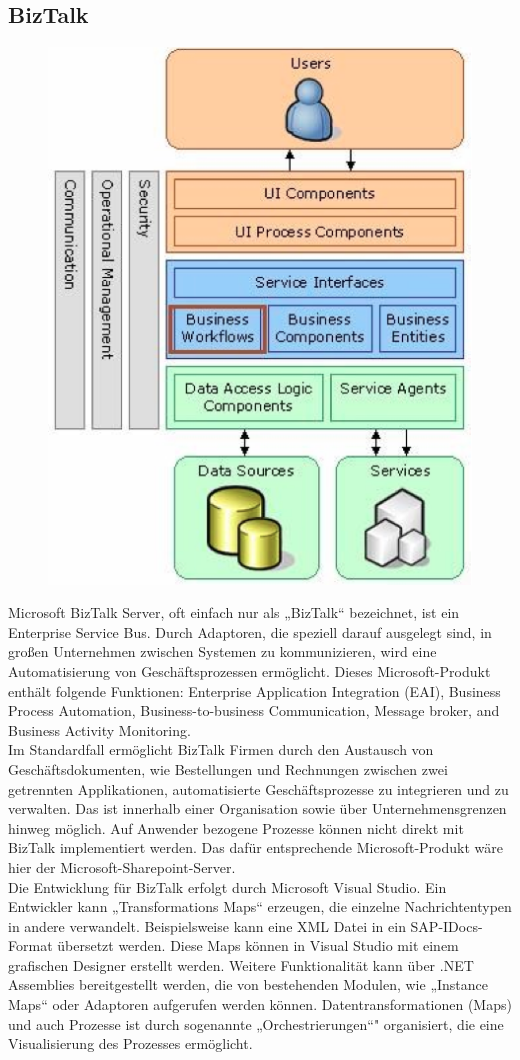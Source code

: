 \documentclass[10pt]{article}
\begin{document}
\subsection{BizTalk}
\begin{figure}
\includegraphics[scale=0.4]{bizzTalk.png}
\end{figure}
Microsoft BizTalk Server, oft einfach nur als „BizTalk“ bezeichnet, ist ein Enterprise Service Bus. Durch Adaptoren, die speziell darauf ausgelegt sind, in großen Unternehmen zwischen Systemen zu kommunizieren, wird eine Automatisierung von Geschäftsprozessen ermöglicht. Dieses Microsoft-Produkt enthält folgende Funktionen: Enterprise Application Integration (EAI), Business Process Automation, Business-to-business Communication, Message broker, and Business Activity Monitoring. \\
Im Standardfall ermöglicht BizTalk Firmen durch den Austausch von Geschäftsdokumenten, wie Bestellungen und Rechnungen zwischen zwei getrennten Applikationen, automatisierte Geschäftsprozesse zu integrieren und zu verwalten. Das ist innerhalb einer Organisation sowie über Unternehmensgrenzen hinweg möglich. Auf Anwender bezogene Prozesse können nicht direkt mit BizTalk implementiert werden. Das dafür entsprechende Microsoft-Produkt wäre hier der Microsoft-Sharepoint-Server. \\
Die Entwicklung für BizTalk erfolgt durch Microsoft Visual Studio. Ein Entwickler kann „Transformations Maps“ erzeugen, die einzelne Nachrichtentypen in andere verwandelt. Beispielsweise kann eine XML Datei in ein SAP-IDocs-Format übersetzt werden. Diese Maps können in Visual Studio mit einem grafischen Designer erstellt werden. Weitere Funktionalität kann über .NET Assemblies bereitgestellt werden, die von bestehenden Modulen, wie „Instance Maps“ oder Adaptoren aufgerufen werden können. Datentransformationen (Maps) und auch Prozesse ist durch sogenannte „Orchestrierungen“" organisiert, die eine Visualisierung des Prozesses ermöglicht.
\end{document}
